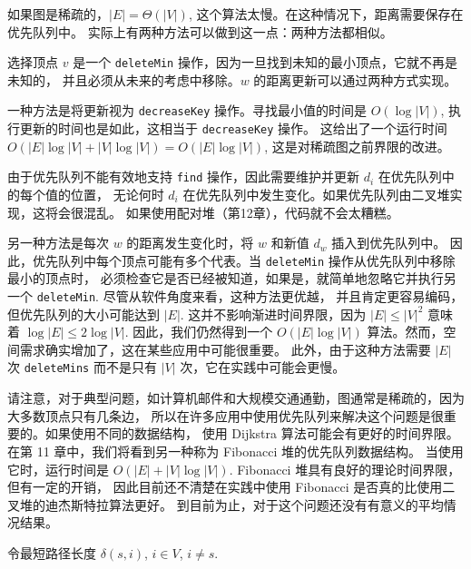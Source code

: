 \documentclass[a4paper]{ctexart}
\theoremstyle{definition}
\theoremstyle{definition}
\begin{document}
如果图是稀疏的，\( |E| = \Theta(|V|) \), 这个算法太慢。在这种情况下，距离需要保存在优先队列中。
实际上有两种方法可以做到这一点：两种方法都相似。

选择顶点 \( v \) 是一个 \verb|deleteMin| 操作，因为一旦找到未知的最小顶点，它就不再是未知的，
并且必须从未来的考虑中移除。\( w \) 的距离更新可以通过两种方式实现。

一种方法是将更新视为 \verb|decreaseKey| 操作。寻找最小值的时间是 \( O(\log|V|) \), 执行更新的时间也是如此，这相当于 \verb|decreaseKey| 操作。
这给出了一个运行时间 \( O(|E|\log|V| + |V|\log|V|) = O(|E|\log|V|) \), 这是对稀疏图之前界限的改进。

由于优先队列不能有效地支持 \verb|find| 操作，因此需要维护并更新 \( d_i \) 在优先队列中的每个值的位置，
无论何时 \( d_i \) 在优先队列中发生变化。如果优先队列由二叉堆实现，这将会很混乱。
如果使用配对堆（第12章），代码就不会太糟糕。

另一种方法是每次 \( w \) 的距离发生变化时，将 \( w \) 和新值 \( d_w \) 插入到优先队列中。
因此，优先队列中每个顶点可能有多个代表。当 \verb|deleteMin| 操作从优先队列中移除最小的顶点时，
必须检查它是否已经被知道，如果是，就简单地忽略它并执行另一个 \verb|deleteMin|. 尽管从软件角度来看，这种方法更优越，
并且肯定更容易编码，但优先队列的大小可能达到 \( |E| \). 这并不影响渐进时间界限，因为 \( |E| \leq |V|^2 \) 意味着 \( \log|E| \leq 2\log|V| \). 
因此，我们仍然得到一个 \( O(|E|\log|V|) \) 算法。然而，空间需求确实增加了，这在某些应用中可能很重要。
此外，由于这种方法需要 \( |E| \) 次 \verb|deleteMins| 而不是只有 \( |V| \) 次，它在实践中可能会更慢。

请注意，对于典型问题，如计算机邮件和大规模交通通勤，图通常是稀疏的，因为大多数顶点只有几条边，
所以在许多应用中使用优先队列来解决这个问题是很重要的。如果使用不同的数据结构，
使用 Dijkstra 算法可能会有更好的时间界限。在第 11 章中，我们将看到另一种称为 Fibonacci 堆的优先队列数据结构。
当使用它时，运行时间是 \( O(|E| + |V|\log|V|) \). Fibonacci 堆具有良好的理论时间界限，但有一定的开销，
因此目前还不清楚在实践中使用 Fibonacci 是否真的比使用二叉堆的迪杰斯特拉算法更好。
到目前为止，对于这个问题还没有有意义的平均情况结果。


令最短路径长度 $\delta(s, i)$,
$i \in V$, $i \neq s$.


\end{document}
